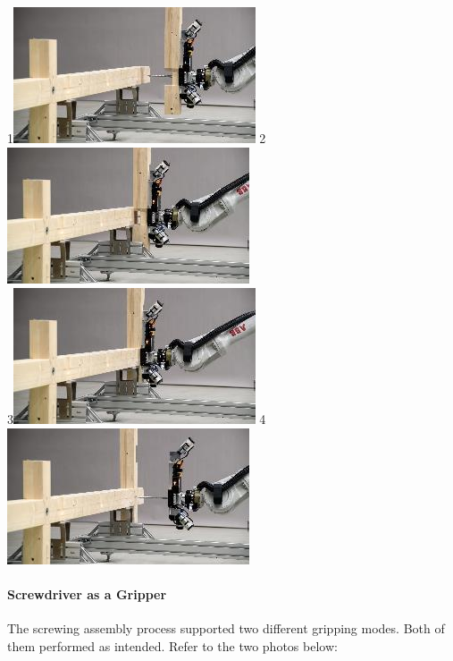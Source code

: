 \documentclass[11pt]{book}
\begin{document}
1\includegraphics[width=7.16cm,height=4.03cm]{./images/image38.jpeg} 2\includegraphics[width=7.16cm,height=4.03cm]{./images/image39.jpeg} \\ 3\includegraphics[width=7.16cm,height=4.03cm]{./images/image40.jpeg} 4\includegraphics[width=7.16cm,height=4.03cm]{./images/image41.jpeg}

\paragraph{Screwdriver as a Gripper}

The screwing assembly process supported two different gripping modes. Both of them performed as intended. Refer to the two photos below:
\end{document}
